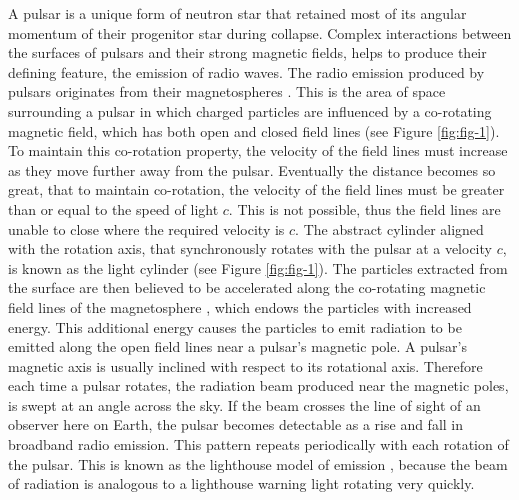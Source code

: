 A pulsar is a unique form of neutron star that retained most of its angular momentum of their progenitor star during collapse. Complex interactions between the surfaces of pulsars and their strong magnetic fields, helps to produce their defining feature, the emission of radio waves. The radio emission produced by pulsars originates from their magnetospheres \citep{ghosh}. This is the area of space surrounding a pulsar in which charged particles are influenced by a co-rotating magnetic field, which has both open and closed field lines \citep{lorimer} (see Figure \ref{fig:fig-1}). To maintain this co-rotation property, the velocity of the field lines must increase as they move further away from the pulsar. Eventually the distance becomes so great, that to maintain co-rotation, the velocity of the field lines must be greater than or equal to the speed of light $c$. This is not possible, thus the field lines are unable to close where the required velocity is $c$. The abstract cylinder aligned with the rotation axis, that synchronously rotates with the pulsar at a velocity $c$, is known as the light cylinder (see Figure \ref{fig:fig-1}). The particles extracted from the surface are then believed to be accelerated along the co-rotating magnetic field lines of the magnetosphere \citep{lorimer2008}, which endows the particles with increased energy. This additional energy causes the particles to emit radiation \citep{lorimer2008} to be emitted along the open field lines near a pulsar's magnetic pole. A pulsar's magnetic axis is usually inclined with respect to its rotational axis. Therefore each time a pulsar rotates, the radiation beam produced near the magnetic poles, is swept at an angle across the sky. If the beam crosses the line of sight of an observer here on Earth, the pulsar becomes detectable as a rise and fall in broadband radio emission. This pattern repeats periodically with each rotation of the pulsar. This is known as the lighthouse model of emission \citep{lorimer2008}, because the beam of radiation is analogous to a lighthouse warning light rotating very quickly.
